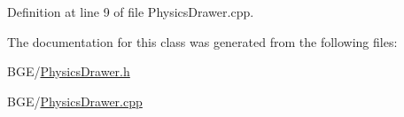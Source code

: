Definition at line 9 of file Physics\-Drawer.\-cpp.



The documentation for this class was generated from the following files\-:\begin{DoxyCompactItemize}
\item 
B\-G\-E/\hyperlink{_physics_drawer_8h}{Physics\-Drawer.\-h}\item 
B\-G\-E/\hyperlink{_physics_drawer_8cpp}{Physics\-Drawer.\-cpp}\end{DoxyCompactItemize}
